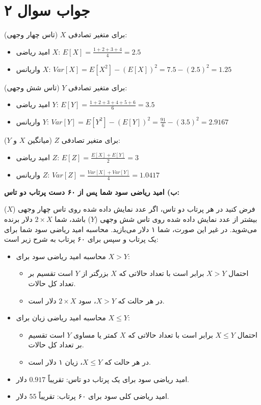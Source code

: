\section*{جواب سوال ۲}

برای متغیر تصادفی \(X\) (تاس چهار وجهی):
\begin{itemize}
	\item امید ریاضی \(X\): \(E[X] = \frac{1 + 2 + 3 + 4}{4} = 2.5\)
	\item واریانس \(X\): \(Var[X] = E[X^2] - (E[X])^2 = 7.5 - (2.5)^2 = 1.25\)
\end{itemize}

برای متغیر تصادفی \(Y\) (تاس شش وجهی):
\begin{itemize}
	\item امید ریاضی \(Y\): \(E[Y] = \frac{1 + 2 + 3 + 4 + 5 + 6}{6} = 3.5\)
	\item واریانس \(Y\): \(Var[Y] = E[Y^2] - (E[Y])^2 = \frac{91}{6} - (3.5)^2 = 2.9167\)
\end{itemize}

برای متغیر تصادفی \(Z\) (میانگین \(X\) و \(Y\)):
\begin{itemize}
	\item امید ریاضی \(Z\): \(E[Z] = \frac{E[X] + E[Y]}{2} = 3\)
	\item واریانس \(Z\): \(Var[Z] = \frac{Var[X] + Var[Y]}{4} = 1.0417\)
\end{itemize}

\textbf{ب) امید ریاضی سود شما پس از ۶۰ دست پرتاب دو تاس:}

فرض کنید در هر پرتاب دو تاس، اگر عدد نمایش داده شده روی تاس چهار وجهی (\(X\)) بیشتر از عدد نمایش داده شده روی تاس شش وجهی (\(Y\)) باشد، شما \(2 \times X\) دلار برنده می‌شوید. در غیر این صورت، شما ۱ دلار می‌بازید. محاسبه امید ریاضی سود شما برای یک پرتاب و سپس برای ۶۰ پرتاب به شرح زیر است:

\begin{itemize}
	\item محاسبه امید ریاضی سود برای \(X > Y\):
	\begin{itemize}
		\item احتمال \(X > Y\) برابر است با تعداد حالاتی که \(X\) بزرگتر از \(Y\) است تقسیم بر تعداد کل حالات.
		\item در هر حالت که \(X > Y\)، سود \(2 \times X\) دلار است.
	\end{itemize}
	\item محاسبه امید ریاضی زیان برای \(X \leq Y\):
	\begin{itemize}
		\item احتمال \(X \leq Y\) برابر است با تعداد حالاتی که \(X\) کمتر یا مساوی \(Y\) است تقسیم بر تعداد کل حالات.
		\item در هر حالت که \(X \leq Y\)، زیان ۱ دلار است.
	\end{itemize}
	\item امید ریاضی سود برای یک پرتاب دو تاس: تقریباً \(0.917\) دلار.
	\item امید ریاضی کلی سود برای ۶۰ پرتاب: تقریباً \(55\) دلار.
\end{itemize}